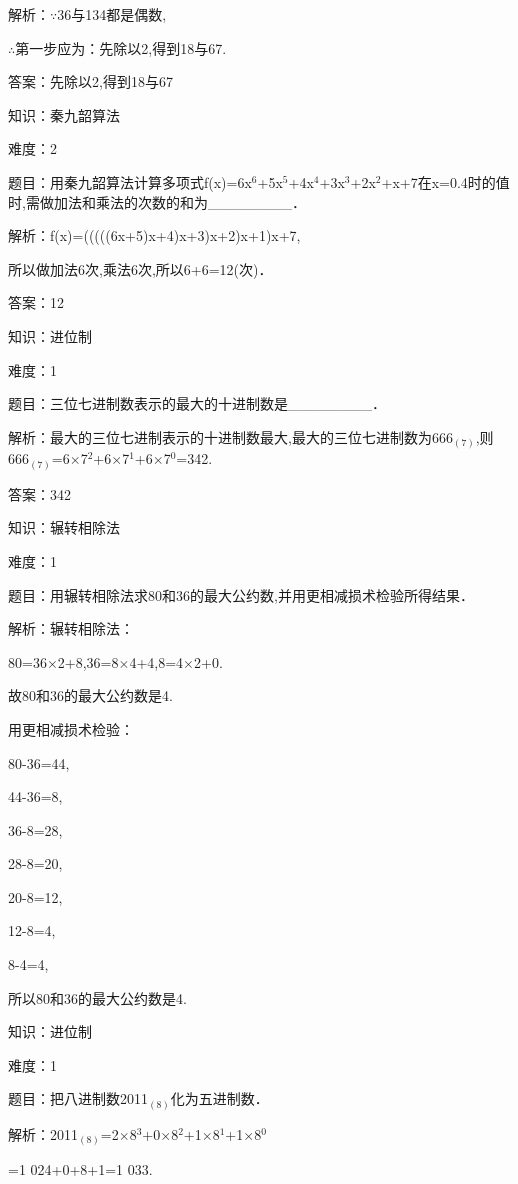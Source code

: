 \documentclass{article} %
\begin{document}
解析：$\mathrm{\because}$36与134都是偶数,

$\mathrm{\therefore}$第一步应为：先除以2,得到18与67.

答案：先除以2,得到18与67

知识：秦九韶算法

难度：2

题目：用秦九韶算法计算多项式f(x)=6x${}^{6}$+5x${}^{5}$+4x${}^{4}$+3x${}^{3}$+2x${}^{2}$+x+7在x=0.4时的值时,需做加法和乘法的次数的和为\_\_\_\_\_\_\_\_．

解析：f(x)=(((((6x+5)x+4)x+3)x+2)x+1)x+7,

所以做加法6次,乘法6次,所以6+6=12(次)．

答案：12

知识：进位制

难度：1

题目：三位七进制数表示的最大的十进制数是\_\_\_\_\_\_\_\_．

解析：最大的三位七进制表示的十进制数最大,最大的三位七进制数为${666}_{(7)}$,则${666}_{(7)}$=6$\mathrm{\times}$7${}^{2}$+6$\mathrm{\times}$7${}^{1}$+6$\mathrm{\times}$7${}^{0}$=342.

答案：342



知识：辗转相除法

难度：1

题目：用辗转相除法求80和36的最大公约数,并用更相减损术检验所得结果．

解析：辗转相除法：

80=36$\mathrm{\times}$2+8,36=8$\mathrm{\times}$4+4,8=4$\mathrm{\times}$2+0.

故80和36的最大公约数是4.

用更相减损术检验：

80-36=44,

44-36=8,

36-8=28,

28-8=20,

20-8=12,

12-8=4,

8-4=4,

所以80和36的最大公约数是4.

知识：进位制

难度：1

题目：把八进制数2011${}_{(8)}$化为五进制数．

解析：2011$_{(8)}$=2$\mathrm{\times}$8${}^{3}$+0$\mathrm{\times}$8${}^{2}$+1$\mathrm{\times}$8${}^{1}$+1$\mathrm{\times}$8${}^{0}$

=1 024+0+8+1=1 033.
\end{document}
